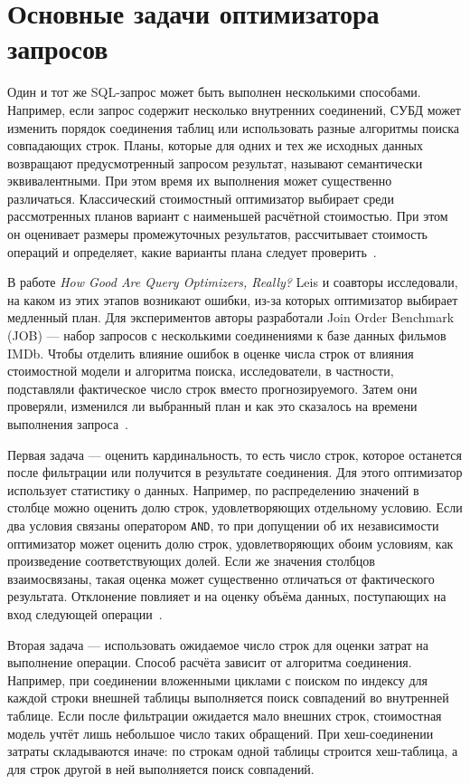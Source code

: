 \documentclass[a4paper, final]{article}
\begin{document}
	\newpage
	\section{Основные задачи оптимизатора запросов}
	
	Один и тот же SQL-запрос может быть выполнен несколькими способами. Например, если запрос содержит несколько внутренних соединений, СУБД может изменить порядок соединения таблиц или использовать разные алгоритмы поиска совпадающих строк. Планы, которые для одних и тех же исходных данных возвращают предусмотренный запросом результат, называют семантически эквивалентными. При этом время их выполнения может существенно различаться. Классический стоимостный оптимизатор выбирает среди рассмотренных планов вариант с наименьшей расчётной стоимостью. При этом он оценивает размеры промежуточных результатов, рассчитывает стоимость операций и определяет, какие варианты плана следует проверить~\cite{leis2015}.
	
	В работе \textit{How Good Are Query Optimizers, Really?} Leis и соавторы исследовали, на каком из этих этапов возникают ошибки, из-за которых оптимизатор выбирает медленный план. Для экспериментов авторы разработали Join Order Benchmark (JOB) --- набор запросов с несколькими соединениями к базе данных фильмов IMDb. Чтобы отделить влияние ошибок в оценке числа строк от влияния стоимостной модели и алгоритма поиска, исследователи, в частности, подставляли фактическое число строк вместо прогнозируемого. Затем они проверяли, изменился ли выбранный план и как это сказалось на времени выполнения запроса~\cite{leis2015}.
	
	Первая задача --- оценить кардинальность, то есть число строк, которое останется после фильтрации или получится в результате соединения. Для этого оптимизатор использует статистику о данных. Например, по распределению значений в столбце можно оценить долю строк, удовлетворяющих отдельному условию. Если два условия связаны оператором \texttt{AND}, то при допущении об их независимости оптимизатор может оценить долю строк, удовлетворяющих обоим условиям, как произведение соответствующих долей. Если же значения столбцов взаимосвязаны, такая оценка может существенно отличаться от фактического результата. Отклонение повлияет и на оценку объёма данных, поступающих на вход следующей операции~\cite{leis2015,wang2024}.
	
	Вторая задача --- использовать ожидаемое число строк для оценки затрат на выполнение операции. Способ расчёта зависит от алгоритма соединения. Например, при соединении вложенными циклами с поиском по индексу для каждой строки внешней таблицы выполняется поиск совпадений во внутренней таблице. Если после фильтрации ожидается мало внешних строк, стоимостная модель учтёт лишь небольшое число таких обращений. При хеш-соединении затраты складываются иначе: по строкам одной таблицы строится хеш-таблица, а для строк другой в ней выполняется поиск совпадений.
	
\end{document}
